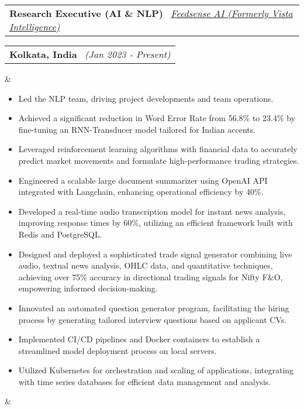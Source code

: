 \documentclass[11pt,a4paper,sans]{moderncv}
\makeatletter
\newcommand*{\customcventry}[7][.13em]{
\begin{tabular}{@{}l}
{\bfseries #4} \
{\itshape #3}
\end{tabular}
\hfill
\begin{tabular}{l@{}}
{\bfseries #5} \
{\itshape #2}
\end{tabular}
\ifx&#7&%
\else{\
\begin{minipage}{\maincolumnwidth}%
\small#7%
\end{minipage}}\fi%
\par\addvspace{#1}}
\makeatother
\begin{document}
\customcventry{(Jan 2023 ‐ Present)}{{\color{blue}\href{https://feedsense.ai/}{Feedsense AI (Formerly Vista Intelligence)}}}{Research Executive (AI \& NLP) }{Kolkata, 
India}{}{
{\begin{itemize}[leftmargin=0.6cm, label={\textbullet}]
\item Led the NLP team, driving project developments and team operations.
\item Achieved a significant reduction in Word Error Rate from 56.8\% to 23.4\% by fine-tuning an RNN-Transducer model tailored for Indian accents.
\item Leveraged reinforcement learning algorithms with financial data to accurately predict market movements and formulate high-performance trading strategies.
\item Engineered a scalable large document summarizer using OpenAI API integrated with Langchain, enhancing operational efficiency by 40\%.
\item Developed a real-time audio transcription model for instant news analysis, improving response times by 60\%, utilizing an efficient framework built with Redis and PostgreSQL.
\item Designed and deployed a sophisticated trade signal generator combining live audio, textual news analysis, OHLC data, and quantitative techniques, achieving over 75\% accuracy in directional trading signals for Nifty F\&O, empowering informed decision-making.
\item Innovated an automated question generator program, facilitating the hiring process by generating tailored interview questions based on applicant CVs.
\item Implemented CI/CD pipelines and Docker containers to establish a streamlined model deployment process on local servers.
\item Utilized Kubernetes for orchestration and scaling of applications, integrating with time series databases for efficient data management and analysis.
\end{itemize}}}

\end{document}
